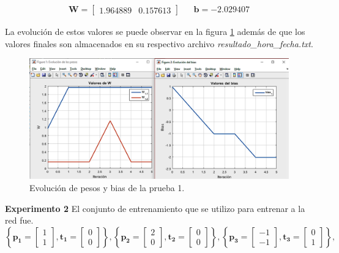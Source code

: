 \documentclass[12pt, titlepage]{article}
\begin{document}
\begin{align*}
\boldsymbol{W} = \left[\begin{array}{cc}1.964889 & 0.157613\end{array}\right] && \boldsymbol{b} = -2.029407
\end{align*}

La evolución de estos valores se puede observar en la figura \ref{fig:pesosbias} además de que los valores finales son almacenados en su respectivo archivo \emph{resultado\_hora\_fecha.txt}.
\begin{figure}[H]
    \begin{center}
        \includegraphics[width=15cm]{img/perceptron1/pesosbias.png}
        \caption{Evolución de pesos y bias de la prueba 1.}
        \label{fig:pesosbias}
    \end{center}
\end{figure}
\textbf{Experimento 2}
El conjunto de entrenamiento que se utilizo para entrenar a la red fue.
\[ \left\lbrace \boldsymbol{p_1} = \left[\begin{array}{c} 1\\ 1\end{array}\right], \boldsymbol{t_1} = \left[\begin{array}{c} 0\\ 0\end{array}\right]  \right\rbrace, \left\lbrace \boldsymbol{p_2} = \left[\begin{array}{c} 2\\ 0\end{array}\right], \boldsymbol{t_2} = \left[\begin{array}{c} 0\\ 0\end{array}\right]  \right\rbrace, \left\lbrace \boldsymbol{p_3} = \left[\begin{array}{c} -1\\ -1\end{array}\right], \boldsymbol{t_3} = \left[\begin{array}{c} 0\\ 1\end{array}\right]  \right\rbrace,\]
\end{document}
